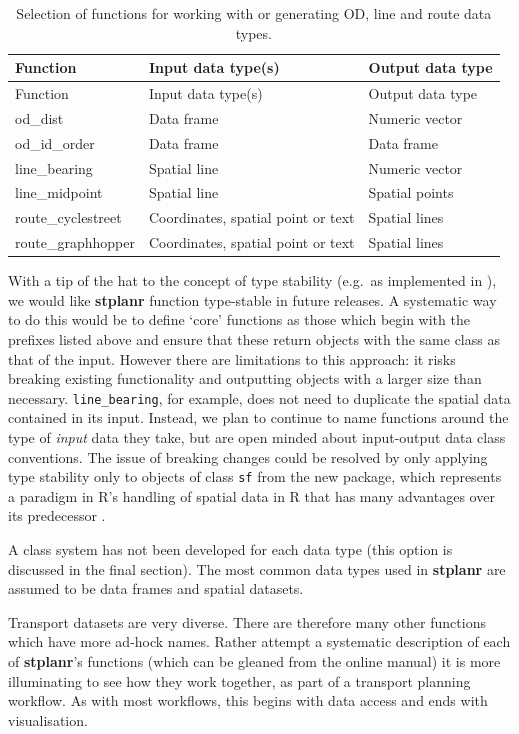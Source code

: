 \begin{longtable}[]{@{}lll@{}}
\caption{Selection of functions for working with or generating OD, line
and route data types.}\tabularnewline
\toprule
Function & Input data type(s) & Output data type\tabularnewline
\midrule
\endfirsthead
\toprule
Function & Input data type(s) & Output data type\tabularnewline
\midrule
\endhead
od\_dist & Data frame & Numeric vector\tabularnewline
od\_id\_order & Data frame & Data frame\tabularnewline
line\_bearing & Spatial line & Numeric vector\tabularnewline
line\_midpoint & Spatial line & Spatial points\tabularnewline
route\_cyclestreet & Coordinates, spatial point or text & Spatial
lines\tabularnewline
route\_graphhopper & Coordinates, spatial point or text & Spatial
lines\tabularnewline
\bottomrule
\end{longtable}

With a tip of the hat to the concept of type stability (e.g.~as
implemented in ), we would like
\textbf{stplanr} function type-stable in future releases.
A systematic way to do this would be to define `core' functions
as those which begin with the prefixes listed above
and ensure that these return objects with the same class as
that of the input. However there are limitations to this approach: it
risks breaking existing functionality and outputting objects with a
larger size than necessary.
\texttt{line\_bearing}, for example, does
not need to duplicate the spatial data contained in its input.
Instead,
we plan to continue to name functions around the type of \emph{input}
data they take, but are open minded about input-output data
class conventions.
The issue of breaking changes could be resolved by only applying type stability
only to objects of class \texttt{sf} from  the new  package,
which represents a paradigm in R's handling of
spatial data in R that has many advantages over its predecessor .

A class system has not been developed for each data type (this option is
discussed in the final section). The most common data types used in
\textbf{stplanr} are assumed to be data frames and spatial datasets.

Transport datasets are very diverse. There are therefore many other
functions which have more ad-hock names. Rather attempt a systematic
description of each of \textbf{stplanr}'s functions (which can be
gleaned from the online manual) it is more illuminating to see how they
work together, as part of a transport planning workflow. As with most
workflows, this begins with data access and ends with visualisation.

